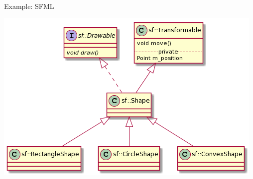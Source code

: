 \begin{frame}{Example: SFML}

  \centering\includegraphics[width=\textwidth]{images/sfml-shapes}
\end{frame}

